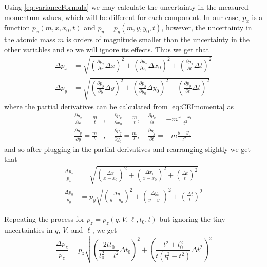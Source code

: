 Using \eqref{eq:varianceFormula} we may calculate the uncertainty in the measured momentum values, which will be different for each component. In our case, $p_x$ is a function $p_x(m,x,x_0,t)$ and $p_y = p_y(m,y,y_0,t)$, however, the uncertainty in the atomic mass $m$ is orders of magnitude smaller than the uncertainty in the other variables and so we will ignore its effects. Thus we get that
\begin{subequations}
  \begin{align}
  \Delta p_x &= \sqrt{
    \left( \frac{\partial p_x}{\partial x}\Delta x \right)^2
    + \left( \frac{\partial p_x}{\partial x_0}\Delta x_0 \right)^2
    + \left(\frac{\partial p_x}{\partial t}\Delta t \right)^2
   } \\
  \Delta p_y &= \sqrt{
    \left( \frac{\partial p_y}{\partial y}\Delta y \right)^2
    + \left(\frac{\partial p_y}{\partial y_0}\Delta y_0 \right)^2
    + \left(\frac{\partial p_y}{\partial t}\Delta t \right)^2
  }
  \end{align}
\end{subequations}
where the partial derivatives can be calculated from \eqref{eq:CEImomenta} as
\begin{subequations}
  \begin{align}
  \frac{\partial p_x}{\partial x} = \frac{m}{t} &,\quad \frac{\partial p_x}{\partial x_0} = \frac{m}{t} ,\quad \frac{\partial p_x}{\partial t} = -m\frac{x-x_0}{t^2}\\
  \frac{\partial p_y}{\partial y} = \frac{m}{t} &,\quad \frac{\partial p_y}{\partial y_0} = \frac{m}{t} ,\quad \frac{\partial p_y}{\partial t} = -m\frac{y-y_0}{t^2}
  \end{align}
\end{subequations}
and so after plugging in the partial derivatives and rearranging slightly we get that
\begin{subequations}
  \begin{align}
  \frac{\Delta p_x}{p_x} &= \sqrt{
    \left( \frac{\Delta x}{x - x_0} \right)^2
    + \left( \frac{\Delta x_0}{x - x_0} \right)^2
    + \left( \frac{\Delta t}{t} \right)^2 } \\
  \frac{\Delta p_y}{p_y} &= p_y \sqrt{
    \left( \frac{\Delta y}{y - y_0} \right)^2
    + \left( \frac{\Delta y_0}{y - y_0} \right)^2
    + \left( \frac{\Delta t}{t} \right)^2 }
  \end{align}
\end{subequations}

Repeating the process for $p_z = p_z(q,V,\ell,t_0,t)$ but ignoring the tiny uncertainties in $q$, $V$, and $\ell$, we get
\begin{equation}
\frac{\Delta p_z}{p_z} = p_z \sqrt{
  \left( \frac{2tt_0}{t_0^2 - t^2} \Delta t_0 \right)^2
  + \left( \frac{t^2 + t_0^2}{t(t_0^2 - t^2)} \Delta t^2 \right)^2
}
\end{equation}

